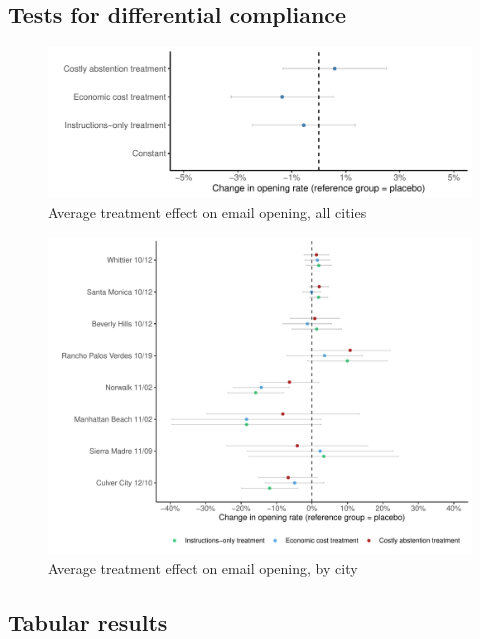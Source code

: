 \documentclass[12pt,final,fleqn]{article}
\theoremstyle{plain}
\begin{document}



\pagebreak
\subsection{Tests for differential compliance} \label{sec: diff_compliance}

\begin{figure}[H]
\includegraphics[width = \textwidth]{../figs/fgA4.pdf}
\caption{Average treatment effect on email opening, all cities}
\label{fig: differential_compliance}
\end{figure}

\begin{figure}[H]
\includegraphics[width = \textwidth]{../figs/fgA5.pdf}
\caption{Average treatment effect on email opening, by city}
\label{fig: differential_compliance_city}
\end{figure}



\clearpage
\pagebreak

\subsection{Tabular results} \label{sec: tables}
\end{document}
